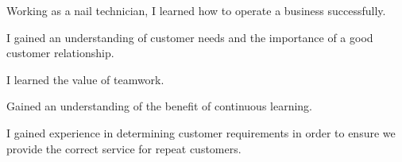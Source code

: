 

\begin{cventries}

  \cventry
    {} %
    {} %
    {} %
    {} %
    {
      \begin{cvitems} %
      \item Working as a nail technician, I learned how to operate a business successfully.
      \item I gained an understanding of customer needs and the importance of a good customer relationship.
      \item I learned the value of teamwork.
      \item Gained an understanding of the benefit of continuous learning.
      \item I gained experience in determining customer requirements in order to ensure we provide the correct service for repeat customers.
      \end{cvitems}
    }


\end{cventries}
